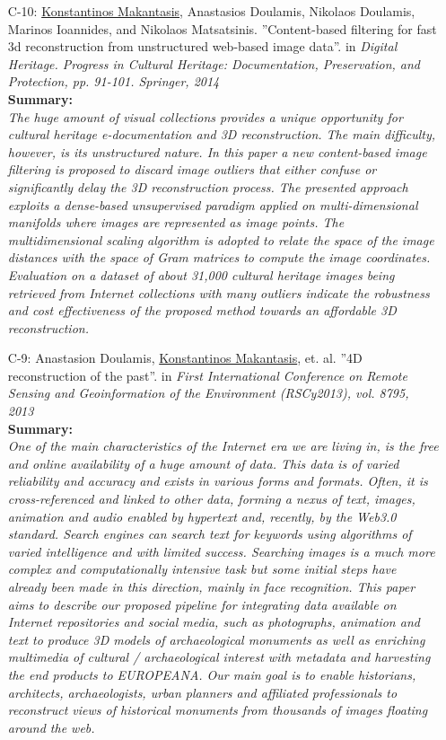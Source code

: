 \documentclass[a4paper,10pt]{article}
\begin{document}
\begin{itemize}
	\item [C-10:]\underline{Konstantinos Makantasis}, Anastasios Doulamis, Nikolaos Doulamis, Marinos Ioannides, and Nikolaos Matsatsinis. ''Content-based filtering for fast 3d reconstruction from unstructured web-based image data''. in \textit{Digital Heritage. Progress in Cultural Heritage: Documentation, Preservation, and Protection, pp. 91-101. Springer, 2014}\\
	\textbf{Summary:}\\
	\textit{The huge amount of visual collections provides a unique opportunity for cultural heritage e-documentation and 3D reconstruction. The main difficulty, however, is its unstructured nature. In this paper a new content-based image filtering is proposed to discard image outliers that either confuse or significantly delay the 3D reconstruction process. The presented approach exploits a dense-based unsupervised paradigm applied on multi-dimensional manifolds where images are represented as image points. The multidimensional scaling algorithm is adopted to relate the space of the image distances with the space of Gram matrices to compute the image coordinates. Evaluation on a dataset of about 31,000 cultural heritage images being retrieved from Internet collections with many outliers indicate the robustness and cost effectiveness of the proposed method towards an affordable 3D reconstruction.}
	
	\item [C-9:]Anastasion Doulamis, \underline{Konstantinos Makantasis}, et. al. ''4D reconstruction of the past''. in \textit{First International Conference on Remote Sensing and Geoinformation of the Environment (RSCy2013), vol. 8795, 2013}\\
	\textbf{Summary:}\\
	\textit{One of the main characteristics of the Internet era we are living in, is the free and online availability of a huge amount of data. This data is of varied reliability and accuracy and exists in various forms and formats. Often, it is cross-referenced and linked to other data, forming a nexus of text, images, animation and audio enabled by hypertext and, recently, by the Web3.0 standard. Search engines can search text for keywords using algorithms of varied intelligence and with limited success. Searching images is a much more complex and computationally intensive task but some initial steps have already been made in this direction, mainly in face recognition. This paper aims to describe our proposed pipeline for integrating data available on Internet repositories and social media, such as photographs, animation and text to produce 3D models of archaeological monuments as well as enriching multimedia of cultural / archaeological interest with metadata and harvesting the end products to EUROPEANA. Our main goal is to enable historians, architects, archaeologists, urban planners and affiliated professionals to reconstruct views of historical monuments from thousands of images floating around the web.}
	

\end{itemize}
\end{document}
